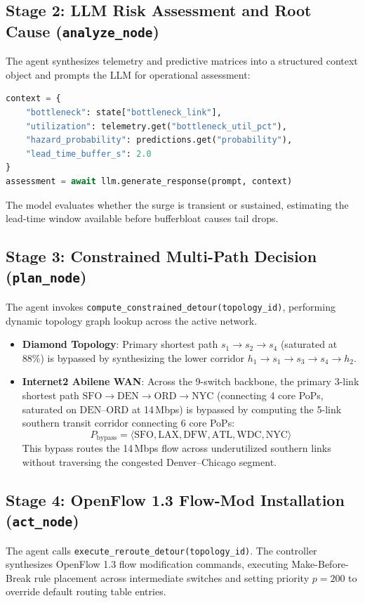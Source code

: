 \subsection{Stage 2: LLM Risk Assessment and Root Cause (\texttt{analyze\_node})}
The agent synthesizes telemetry and predictive matrices into a structured context object and prompts the LLM for operational assessment:
\begin{lstlisting}[language=Python]
context = {
    "bottleneck": state["bottleneck_link"],
    "utilization": telemetry.get("bottleneck_util_pct"),
    "hazard_probability": predictions.get("probability"),
    "lead_time_buffer_s": 2.0
}
assessment = await llm.generate_response(prompt, context)
\end{lstlisting}
The model evaluates whether the surge is transient or sustained, estimating the lead-time window available before bufferbloat causes tail drops.

\subsection{Stage 3: Constrained Multi-Path Decision (\texttt{plan\_node})}
The agent invokes \texttt{compute\_constrained\_detour(topology\_id)}, performing dynamic topology graph lookup across the active network.
\begin{itemize}
  \item \textbf{Diamond Topology}: Primary shortest path $s_1 \to s_2 \to s_4$ (saturated at 88\%) is bypassed by synthesizing the lower corridor $h_1 \to s_1 \to s_3 \to s_4 \to h_2$.
  \item \textbf{Internet2 Abilene WAN}: Across the 9-switch backbone, the primary 3-link shortest path $\text{SFO} \to \text{DEN} \to \text{ORD} \to \text{NYC}$ (connecting 4 core PoPs, saturated on $\text{DEN--ORD}$ at 14\,Mbps) is bypassed by computing the 5-link southern transit corridor connecting 6 core PoPs:
  \begin{equation}
    P_{\text{bypass}} = \langle \text{SFO}, \text{LAX}, \text{DFW}, \text{ATL}, \text{WDC}, \text{NYC} \rangle
  \end{equation}
  This bypass routes the 14\,Mbps flow across underutilized southern links without traversing the congested Denver--Chicago segment.
\end{itemize}

\subsection{Stage 4: OpenFlow 1.3 Flow-Mod Installation (\texttt{act\_node})}
The agent calls \texttt{execute\_reroute\_detour(topology\_id)}. The controller synthesizes OpenFlow 1.3 flow modification commands, executing Make-Before-Break rule placement across intermediate switches and setting priority $p=200$ to override default routing table entries.


